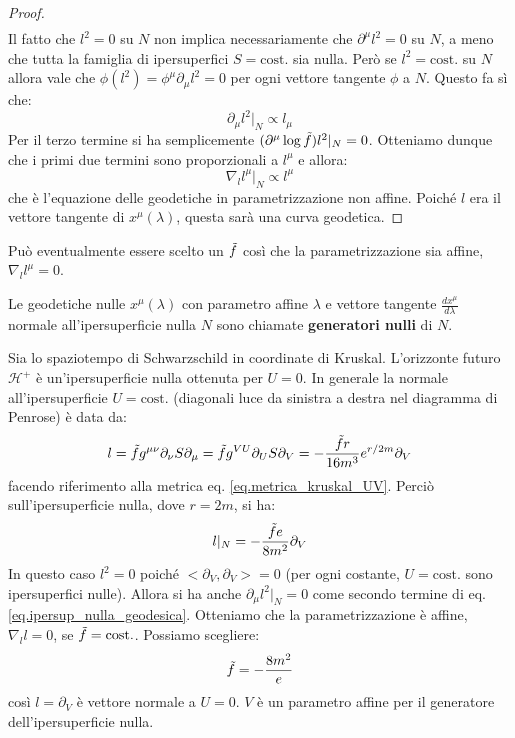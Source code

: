 \begin{proof}
\begin{align}
\end{align}
Il fatto che $l^2=0$ su $N$ non implica necessariamente che $\partial^\mu l^2 =0$ su $N$, a meno che tutta la famiglia di ipersuperfici $S= \textrm{cost.}$ sia nulla. Però se $l^2 = \textrm{cost.}$ su $N$ allora vale che $\phi(l^2) = \phi^\mu \partial_\mu l^2 = 0$ per ogni vettore tangente $\phi$ a $N$. Questo fa sì che:
\begin{equation*}
    \partial_\mu l^2 |_N \propto l_\mu
\end{equation*}
Per il terzo termine si ha semplicemente $(\partial^\mu \log\Tilde{f})l^2 |_N =0$.  Otteniamo dunque che i primi due termini sono proporzionali a $l^\mu$ e allora:
\begin{equation*}
    \nabla_l l^\mu |_N \propto l^\mu
\end{equation*}
che è l'equazione delle geodetiche in parametrizzazione non affine. Poiché $l$ era il vettore tangente di $x^\mu(\lambda)$, questa sarà una curva geodetica.
\end{proof}
Può eventualmente essere scelto un $\Tilde{f}$ così che la parametrizzazione sia affine, $\nabla_l l^\mu =0$.
\begin{definizione}
    Le geodetiche nulle $x^\mu(\lambda)$ con parametro affine $\lambda$ e vettore tangente $\frac{d x^\mu}{d\lambda}$ normale all'ipersuperficie nulla $N$ sono chiamate \textbf{generatori nulli} di $N$.
\end{definizione}

\begin{esempio}
Sia lo spaziotempo di Schwarzschild in coordinate di Kruskal. L'orizzonte futuro $\mathcal{H}^+$ è un'ipersuperficie nulla ottenuta per $U = 0$. In generale la normale all'ipersuperficie $U = \textrm{cost.}$ (diagonali  luce da sinistra a destra nel diagramma di Penrose) è data da:
\begin{equation*}
    l = \Tilde{f}g^{\mu\nu}\partial_\nu S\partial_\mu = \Tilde{f}g^{VU}\partial_{U}S\partial_V = - \frac{\Tilde{f}r}{16m^3}e^{r/2m}\partial_V
\end{equation*}
facendo riferimento alla metrica eq. \ref{eq.metrica_kruskal_UV}. Perciò sull'ipersuperficie nulla, dove $r = 2m$, si ha:
\begin{equation*}
    l|_N = - \frac{\Tilde{f}e}{8m^2}\partial_V
\end{equation*}
In questo caso $l^2 = 0$ poiché $<\partial_V, \partial_V> = 0$ (per ogni costante, $U = \textrm{cost.}$ sono ipersuperfici nulle). Allora si ha anche $\partial_\mu l^2|_N = 0$  come secondo termine di eq. \ref{eq.ipersup_nulla_geodesica}. Otteniamo che la parametrizzazione è affine, $\nabla_l l = 0$, se $\Tilde{f}= \textrm{cost.} $. Possiamo scegliere:
\begin{equation*}
    \Tilde{f}= -\frac{8m^2}{e}
\end{equation*}
così $l = \partial_V$ è vettore normale a $U= 0$. $V$ è un parametro affine per il generatore dell'ipersuperficie nulla.
\end{esempio}

